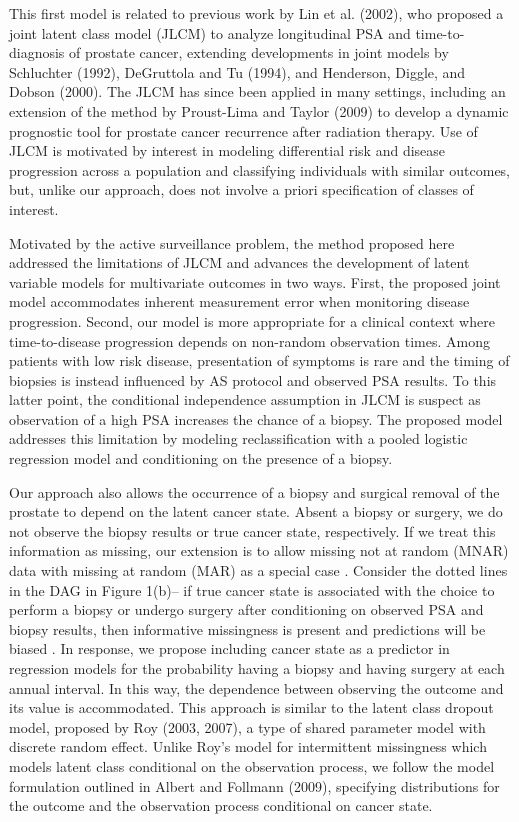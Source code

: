 \documentclass[12pt, letterpaper]{article}
\begin{document}
This first model is related to previous work by Lin et al. (2002)\nocite{Lin2002}, who proposed a joint latent class model (JLCM) to analyze longitudinal PSA and time-to-diagnosis of prostate cancer, extending developments in joint models by Schluchter (1992)\nocite{Schluchter1992}, DeGruttola and Tu (1994)\nocite{DeGruttola1994}, and Henderson, Diggle, and Dobson (2000)\nocite{Henderson2000}. The JLCM has since been applied in many settings, including an extension of the method by Proust-Lima and Taylor (2009)\nocite{Proust2009} to develop a dynamic prognostic tool for prostate cancer recurrence after radiation therapy. Use of JLCM is motivated by interest in modeling differential risk and disease progression across a population and classifying individuals with similar outcomes, but, unlike our approach, does not involve a priori specification of classes of interest. 

Motivated by the active surveillance problem, the method proposed here addressed the limitations of JLCM and advances the development of latent variable models for multivariate outcomes in two ways. First, the proposed joint model accommodates inherent measurement error when monitoring disease progression. Second, our model is more appropriate for a clinical context where time-to-disease progression depends on non-random observation times. Among patients with low risk disease, presentation of symptoms is rare and the timing of biopsies is instead influenced by AS protocol and observed PSA results. To this latter point, the conditional independence assumption in JLCM is suspect as observation of a high PSA increases the chance of a biopsy. The proposed model addresses this limitation by modeling reclassification with a pooled logistic regression model \cite{Cupples1988, D'Agostino1990} and conditioning on the presence of a biopsy. 

Our approach also allows the occurrence of a biopsy and surgical removal of the prostate to depend on the latent cancer state. Absent a biopsy or surgery, we do not observe the biopsy results or true cancer state, respectively. If we treat this information as missing, our extension is to allow missing not at random (MNAR) data with missing at random (MAR) as a special case \cite{Little2014}. Consider the dotted lines in the DAG in Figure 1(b)-- if true cancer state is associated with the choice to perform a biopsy or undergo surgery after conditioning on observed PSA and biopsy results, then informative missingness is present and predictions will be biased \cite{Wu1988}. In response, we propose including cancer state as a predictor in regression models for the probability having a biopsy and having surgery at each annual interval. In this way, the dependence between observing the outcome and its value is accommodated.
This approach is similar to the latent class dropout model, proposed by Roy (2003, 2007)\nocite{Roy2003,Roy2007}, a type of shared parameter model \cite{Follmann1995} with discrete random effect. Unlike Roy's model for intermittent missingness which models latent class conditional on the observation process, we follow the model formulation outlined in Albert and Follmann (2009)\nocite{Albert2009}, specifying distributions for the outcome and the observation process conditional on cancer state.
\end{document}
